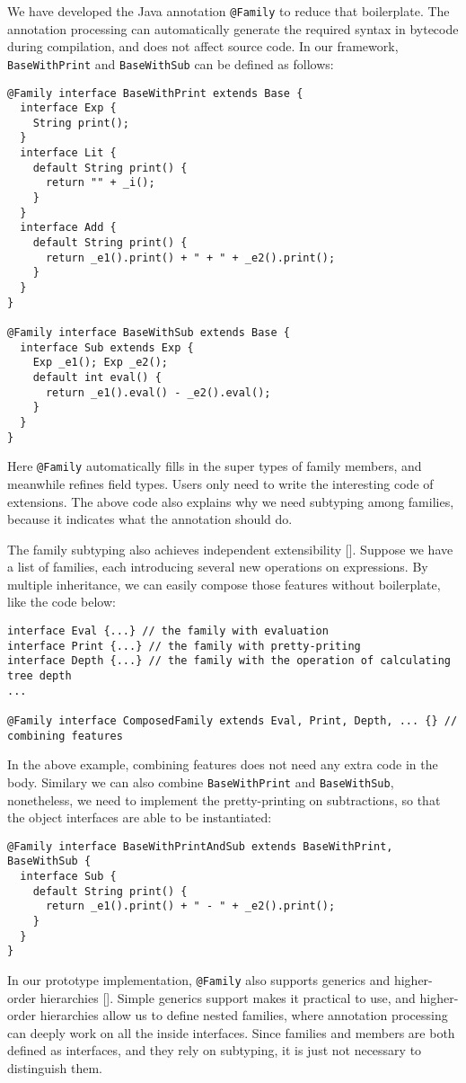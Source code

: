 We have developed the Java annotation \lstinline|@Family| to reduce that boilerplate. The annotation processing can automatically
generate the required syntax in bytecode during compilation, and does not affect source code. In our framework, \lstinline|BaseWithPrint|
and \lstinline|BaseWithSub| can be defined as follows:
\begin{lstlisting}
@Family interface BaseWithPrint extends Base {
  interface Exp {
    String print();
  }
  interface Lit {
    default String print() {
      return "" + _i();
    }
  }
  interface Add {
    default String print() {
      return _e1().print() + " + " + _e2().print();
    }
  }
}

@Family interface BaseWithSub extends Base {
  interface Sub extends Exp {
    Exp _e1(); Exp _e2();
    default int eval() {
      return _e1().eval() - _e2().eval();
    }
  }
}
\end{lstlisting}
Here \lstinline|@Family| automatically fills in the super types of family members, and meanwhile
refines field types. Users only need to write the interesting code of extensions. The above code
also explains why we need subtyping among families, because it indicates what the annotation should do.

The family subtyping also achieves independent extensibility []. Suppose we have a list of families,
each introducing several new operations on expressions. By multiple inheritance, we can easily compose
those features without boilerplate, like the code below:
\begin{lstlisting}
interface Eval {...} // the family with evaluation
interface Print {...} // the family with pretty-priting
interface Depth {...} // the family with the operation of calculating tree depth
...

@Family interface ComposedFamily extends Eval, Print, Depth, ... {} // combining features
\end{lstlisting}

In the above example, combining features does not need any extra code in the body. Similary we can also
combine \lstinline|BaseWithPrint| and \lstinline|BaseWithSub|, nonetheless, we need to implement the
pretty-printing on subtractions, so that the object interfaces are able to be instantiated:
\begin{lstlisting}
@Family interface BaseWithPrintAndSub extends BaseWithPrint, BaseWithSub {
  interface Sub {
    default String print() {
      return _e1().print() + " - " + _e2().print();
    }
  }
}
\end{lstlisting}

In our prototype implementation, \lstinline|@Family| also supports generics and higher-order hierarchies [].
Simple generics support makes it practical to use, and higher-order hierarchies allow us to define nested families,
where annotation processing can deeply work on all the inside interfaces. Since families and members are both defined
as interfaces, and they rely on subtyping, it is just not necessary to distinguish them.





